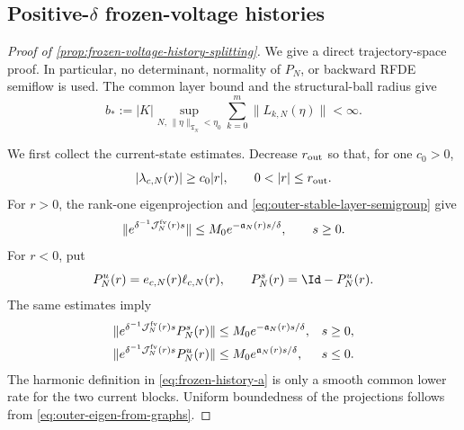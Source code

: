 \subsection{Positive-\texorpdfstring{\(\delta\)}{delta} frozen-voltage histories}

\begin{proof}[Proof of \cref{prop:frozen-voltage-history-splitting}]
We give a direct trajectory-space proof.  In particular, no determinant,
normality of \(P_N\), or backward RFDE semiflow is used.  The common layer
bound and the structural-ball radius give
\begin{equation}
 b_*:=|K|\sup_{N,\,\|\eta\|_{\mathfrak T_N}<\eta_0}
       \sum_{k=0}^m\|L_{k,N}(\eta)\|<\infty.         \label{eq:frozen-layer-common-bound}
\end{equation}

We first collect the current-state estimates.  Decrease \(r_{\rm out}\) so
that, for one \(c_0>0\),
\begin{equation}
 |\lambda_{c,N}(r)|\ge c_0|r|,
 \qquad 0<|r|\le r_{\rm out}.                       \label{eq:frozen-collective-gap}
\end{equation}
For \(r>0\), the rank-one eigenprojection and
\cref{eq:outer-stable-layer-semigroup} give
\begin{equation}
 \|e^{\delta^{-1}\mathcal J_N^{\rm fv}(r)s}\|
 \le M_0e^{-\mathfrak a_N(r)s/\delta},\qquad s\ge0. \label{eq:frozen-current-attracting}
\end{equation}
For \(r<0\), put
\begin{equation}
 P_N^u(r)=e_{c,N}(r)\ell_{c,N}(r),\qquad
 P_N^s(r)=\Id-P_N^u(r).                              \label{eq:frozen-current-projections}
\end{equation}
The same estimates imply
\begin{align}
 \|e^{\delta^{-1}\mathcal J_N^{\rm fv}(r)s}P_N^s(r)\|
 &\le M_0e^{-\mathfrak a_N(r)s/\delta},&&s\ge0,\notag\\
 \|e^{\delta^{-1}\mathcal J_N^{\rm fv}(r)s}P_N^u(r)\|
 &\le M_0e^{\mathfrak a_N(r)s/\delta},&&s\le0.     \label{eq:frozen-current-repelling}
\end{align}
The harmonic definition in \cref{eq:frozen-history-a} is only a smooth
common lower rate for the two current blocks.  Uniform boundedness of the
projections follows from \cref{eq:outer-eigen-from-graphs}.


\end{proof}
